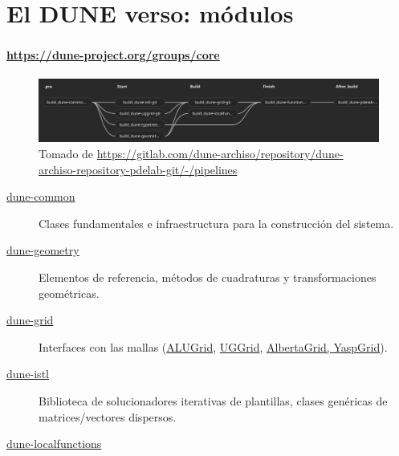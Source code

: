 \section{El DUNE verso: módulos}

\begin{frame}[fragile]
	\frametitle{\secname}
	\framesubtitle{\url{https://dune-project.org/groups/core}}

	\begin{figure}[ht!]
		\centering
		\includegraphics[width=14.6cm]{dependences}
		\caption{Tomado de \url{https://gitlab.com/dune-archiso/repository/dune-archiso-repository-pdelab-git/-/pipelines}}
	\end{figure}

	\begin{description}
		\item[\href{https://dune-project.org/modules/dune-common/}{dune-common}]

			Clases fundamentales e infraestructura para la construcción del sistema.

		\item[\href{https://dune-project.org/modules/dune-geometry/}{dune-geometry}]

			Elementos de referencia, métodos de cuadraturas y transformaciones geométricas.

		\item[\href{https://dune-project.org/modules/dune-grid/}{dune-grid}]

			Interfaces con las mallas (\href{https://dune-project.org/modules/dune-alugrid}{ALUGrid}, \href{https://dune-project.org/modules/dune-uggrid}{UGGrid}, \href{https://dune-project.org/modules/dune-grid}{AlbertaGrid, YaspGrid}). %

		\item[\href{https://dune-project.org/modules/dune-istl}{dune-istl}]

			Biblioteca de solucionadores iterativas de plantillas, clases genéricas de matrices/vectores dispersos.%

		\item[\href{https://dune-project.org/modules/dune-localfunctions}{dune-localfunctions}]


\end{description}
\end{frame}
